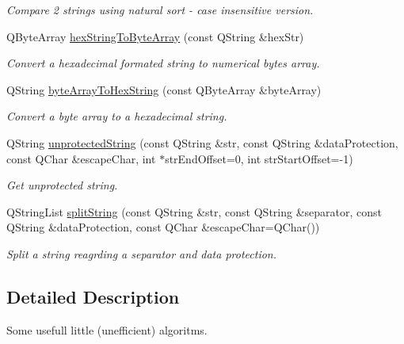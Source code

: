 \begin{DoxyCompactItemize}
\begin{DoxyCompactList}\small\item\em Compare 2 strings using natural sort -\/ case insensitive version. \end{DoxyCompactList}\item 
QByteArray \hyperlink{namespacemdt_algorithms_a5094251abb1557b9b4717b3a0f1a8535}{hexStringToByteArray} (const QString \&hexStr)
\begin{DoxyCompactList}\small\item\em Convert a hexadecimal formated string to numerical bytes array. \end{DoxyCompactList}\item 
QString \hyperlink{namespacemdt_algorithms_a29977b36180db7518a7ee2317265d26b}{byteArrayToHexString} (const QByteArray \&byteArray)
\begin{DoxyCompactList}\small\item\em Convert a byte array to a hexadecimal string. \end{DoxyCompactList}\item 
QString \hyperlink{namespacemdt_algorithms_a4f1b12dbe1f3c93dc5138f144d84de93}{unprotectedString} (const QString \&str, const QString \&dataProtection, const QChar \&escapeChar, int $\ast$strEndOffset=0, int strStartOffset=-\/1)
\begin{DoxyCompactList}\small\item\em Get unprotected string. \end{DoxyCompactList}\item 
QStringList \hyperlink{namespacemdt_algorithms_a28d7d5eb9578936c950039fa2f86a1bf}{splitString} (const QString \&str, const QString \&separator, const QString \&dataProtection, const QChar \&escapeChar=QChar())
\begin{DoxyCompactList}\small\item\em Split a string reagrding a separator and data protection. \end{DoxyCompactList}\end{DoxyCompactItemize}


\subsection{Detailed Description}
Some usefull little (unefficient) algoritms. 

